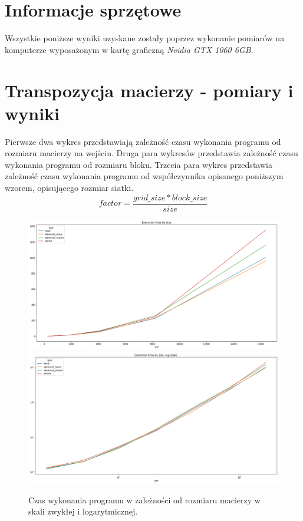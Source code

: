 \documentclass{article}
\begin{document}
    \section{Informacje sprzętowe}
    Wszystkie poniższe wyniki uzyskane zostały poprzez wykonanie pomiarów na komputerze wyposażonym w kartę graficzną \textit{Nvidia GTX 1060 6GB}.
    
    \section{Transpozycja macierzy - pomiary i wyniki}
        Pierwsze dwa wykres przedstawiają zależność czasu wykonania programu od rozmiaru macierzy na wejściu. Druga para wykresów przedstawia zależność czasu wykonania programu od rozmiaru bloku. Trzecia para wykres przedstawia zależność czasu wykonania programu od współczynnika opisanego poniższym wzorem, opisującego rozmiar siatki.
        $$factor = \frac{grid\_size * block\_size}{size}$$
        
        \begin{figure}[htb]
            \centering
            \includegraphics[width=\textwidth]{cuda/Lab2/report/images/matrix_trans_by_size.png}
            \includegraphics[width=\textwidth]{cuda/Lab2/report/images/matrix_trans_by_size_log.png}
            \caption{Czas wykonania programu w zależności od rozmiaru macierzy w skali zwykłej i logarytmicznej.}
        \end{figure}
        
\end{document}
